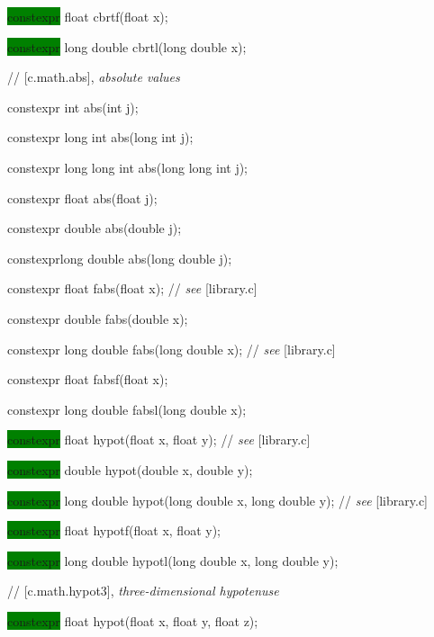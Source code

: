 \documentclass[prd,twocolumn,amsmath,amssymb,nofootinbib,eqsecnum]{revtex4-1}
\newcommand{\highlight}[1]{\colorbox{green}{\!\!\!\! #1}}
\newcommand{\oldhighlight}[1]{#1}
\newcommand{\stdcomment}[1]{{// {\it see} [#1]}}
\begin{document}
{\highlight{constexpr} float cbrtf(float x);

\highlight{constexpr} long double cbrtl(long double x);

\vspace{2ex}

//  [c.math.abs], {\it absolute values}


\oldhighlight{constexpr} int abs(int j);

\oldhighlight{constexpr} long int abs(long int j);

\oldhighlight{constexpr} long long int abs(long long int j);

\oldhighlight{constexpr} float abs(float j);

\oldhighlight{constexpr} double abs(double j);

\oldhighlight{constexpr}long double abs(long double j);

\vspace{2ex}


\oldhighlight{constexpr} float fabs(float x); \stdcomment{library.c}

\oldhighlight{constexpr} double fabs(double x);

\oldhighlight{constexpr} long double fabs(long double x); \stdcomment{library.c}

\oldhighlight{constexpr} float fabsf(float x);

\oldhighlight{constexpr} long double fabsl(long double x);

\vspace{2ex}


\highlight{constexpr} float hypot(float x, float y); \stdcomment{library.c}

\highlight{constexpr} double hypot(double x, double y);

\highlight{constexpr} long double hypot(long double x, long double y); \stdcomment{library.c}

\highlight{constexpr} float hypotf(float x, float y);

\highlight{constexpr} long double hypotl(long double x, long double y);

\vspace{2ex}

// [c.math.hypot3], {\it three-dimensional hypotenuse}


\highlight{constexpr} float hypot(float x, float y, float z);

}
\end{document}
